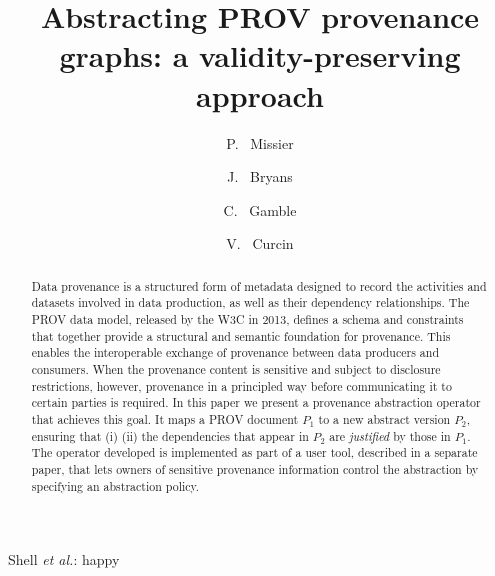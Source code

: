 \documentclass{elsarticle}
\begin{document}
\title{Abstracting PROV provenance graphs: a validity-preserving approach}

 
\author[ncl]{P. ~Missier }

\author[cov]{J. ~Bryans}

\author[ncl]{C. ~Gamble}
    
\author[kcl]{V. ~Curcin}

\address[ncl]{School of Computing, Newcastle University, UK}
\address[cov]{Institute for Future Transport and Cities, Coventry University, UK}
\address[kcl]{Kings College, London, UK}



%
{Shell \MakeLowercase{\textit{et al.}}: happy}


\begin{abstract}
  Data provenance is a structured form of metadata designed to record the activities and datasets involved in data production, as well as their dependency relationships. The PROV data model, released by the W3C in 2013, defines a schema and constraints that together provide a structural and semantic foundation for provenance. This enables the interoperable exchange of provenance between data producers and consumers. When the provenance content is sensitive and subject to disclosure restrictions, however,  provenance in a principled way before communicating it to certain parties is required. In this paper we present a provenance abstraction operator that achieves this goal. It maps a PROV document $P_1$  to a new abstract version $P_2$, ensuring that (i)   (ii) the dependencies that appear in $P_2$ are \textit{justified} by those  in $P_1$.    The operator developed is implemented as part of a user tool, described in a separate paper, that lets owners of sensitive provenance information control the abstraction by specifying an abstraction policy.
\end{abstract}
\end{document}
